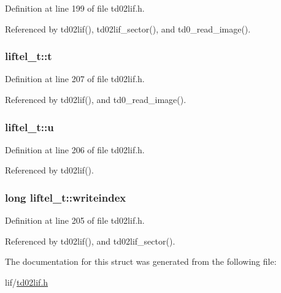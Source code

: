 Definition at line 199 of file td02lif.\+h.



Referenced by td02lif(), td02lif\+\_\+sector(), and td0\+\_\+read\+\_\+image().

\subsubsection[{\texorpdfstring{t}{t}}]{ liftel\+\_\+t\+::t}\hypertarget{structliftel__t_a19ad0aafb060bc0262c7946220f0c407}{}\label{structliftel__t_a19ad0aafb060bc0262c7946220f0c407}


Definition at line 207 of file td02lif.\+h.



Referenced by td02lif(), and td0\+\_\+read\+\_\+image().

\subsubsection[{\texorpdfstring{u}{u}}]{ liftel\+\_\+t\+::u}\hypertarget{structliftel__t_a3a8a41c9a51c6450ac562d525103902a}{}\label{structliftel__t_a3a8a41c9a51c6450ac562d525103902a}


Definition at line 206 of file td02lif.\+h.



Referenced by td02lif().

\subsubsection[{\texorpdfstring{writeindex}{writeindex}}]{\setlength{\rightskip}{0pt plus 5cm}long liftel\+\_\+t\+::writeindex}\hypertarget{structliftel__t_a3c5f11408ea86ded8a0bc0d20a0ea689}{}\label{structliftel__t_a3c5f11408ea86ded8a0bc0d20a0ea689}


Definition at line 205 of file td02lif.\+h.



Referenced by td02lif(), and td02lif\+\_\+sector().



The documentation for this struct was generated from the following file\+:\begin{DoxyCompactItemize}
\item 
lif/\hyperlink{td02lif_8h}{td02lif.\+h}\end{DoxyCompactItemize}
